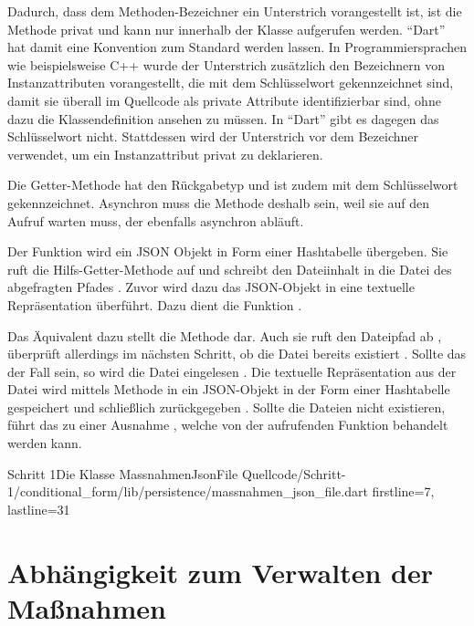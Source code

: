 Dadurch, dass dem Methoden-Bezeichner  ein Unterstrich vorangestellt ist, ist die Methode privat und kann nur innerhalb der Klasse aufgerufen werden.
\enquote{Dart} hat damit eine Konvention zum Standard werden lassen.
In Programmiersprachen wie beispielsweise C++ wurde der Unterstrich zusätzlich den Bezeichnern von Instanzattributen vorangestellt, die mit dem  Schlüsselwort gekennzeichnet sind, damit sie überall im Quellcode als private Attribute identifizierbar sind, ohne dazu die Klassendefinition ansehen zu müssen.
In \enquote{Dart} gibt es dagegen das  Schlüsselwort nicht.
Stattdessen wird der Unterstrich vor dem Bezeichner verwendet, um ein Instanzattribut privat zu deklarieren.

Die Getter-Methode  hat den Rückgabetyp  und ist zudem mit dem Schlüsselwort  gekennzeichnet.
Asynchron muss die Methode deshalb sein, weil sie auf den Aufruf  warten muss, der ebenfalls asynchron abläuft.

Der Funktion   wird ein JSON Objekt in Form einer Hashtabelle übergeben.
Sie ruft die Hilfs-Getter-Methode   auf und schreibt den Dateiinhalt in die Datei des abgefragten Pfades .
Zuvor wird dazu das JSON-Objekt in eine textuelle Repräsentation überführt.
Dazu dient die Funktion .

Das Äquivalent dazu stellt die Methode   dar.
Auch sie ruft den Dateipfad ab , überprüft allerdings im nächsten Schritt, ob die Datei bereits existiert .
Sollte das der Fall sein, so wird die Datei eingelesen .
Die textuelle Repräsentation aus der Datei wird mittels Methode  in ein JSON-Objekt in der Form einer Hashtabelle gespeichert  und schließlich zurückgegeben .
Sollte die Dateien nicht existieren, führt das zu einer Ausnahme , welche von der aufrufenden Funktion behandelt werden kann.

\begin{alexlisting}{Schritt 1}{Die Klasse MassnahmenJsonFile}
  {Quellcode/Schritt-1/conditional_form/lib/persistence/massnahmen_json_file.dart}
  {firstline=7, lastline=31}
  \label{lst:Schritt1KlasseMassnahmenJsonFile}
\end{alexlisting}


\section{ Abhängigkeit zum Verwalten der Maßnahmen}

